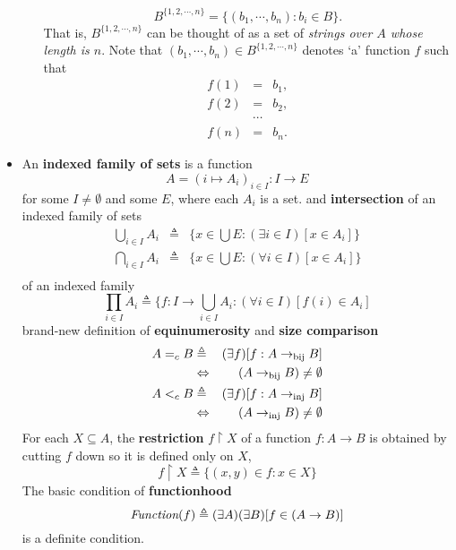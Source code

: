 \documentclass{myproc}
\begin{document}
\begin{itemize}
\begin{itemize}
	\[ B^{\{1, 2, \cdots, n\}} = \{(b_1, \cdots, b_n): b_i \in B\}.\]
	That is, $B^{\{1, 2, \cdots, n\}}$ can be thought of as a set of 
	{\em{}strings over $A$ whose length is $n$\/}.
	Note that $(b_1, \cdots, b_n) \in B^{\{1, 2, \cdots, n\}}$ denotes `a'
	function $f$ such that
	\begin{eqnarray*}
	f(1) & = & b_1,\\
	f(2) & = & b_2,\\
	& \cdots & \\
	f(n) & = & b_n.
	\end{eqnarray*}
		\end{itemize}
\item An {\bf{}indexed family of sets} is a function
	\[ A = (i \mapsto A_i)_{i\in I}: I \rightarrow E\]
	for some $I \ne \emptyset$ and some $E$, where each $A_i$ is a
	set.
	\bit
	 and {\bf{}intersection} of an indexed family of sets
		\begin{eqnarray*}
		\bigcup_{i \in I}A_i & \triangleq &
			\{x \in \bigcup E: (\exists{i \in I})[x \in A_i]\}\\
		\bigcap_{i \in I}A_i & \triangleq &
			\{x \in \bigcup E: (\forall{i \in I})[x \in A_i]\}\\
		\end{eqnarray*}
	 of an indexed family
		\[ \prod_{i \in I}A_i \triangleq
		\{f: I \rightarrow \bigcup_{i\in{I}}A_i: 
		(\forall{i \in I})[f(i) \in A_i] \]
	\w brand-new definition of {\bf{}equinumerosity} and 
		{\bf{}size comparison}
		\begin{eqnarray*}
		A =_c B & \triangleq & (\exists{f})[f: A 
			\rightarrow_{\mbox{\scriptsize{}bij}}
			B]\\
		&  \Leftrightarrow & (A 
			\rightarrow_{\mbox{\scriptsize{}bij}} B) \ne 
			\emptyset\\
		A <_c B & \triangleq & (\exists{f})[f: A 
			\rightarrow_{\mbox{\scriptsize{}inj}}
			B]\\
		& \Leftrightarrow & (A 
			\rightarrow_{\mbox{\scriptsize{}inj}} B) \ne \emptyset
		\end{eqnarray*}
	\eit
\w For each $X \subseteq A$, the {\bf{}restriction} $f \upharpoonright X$ of
	a  function $f: A \rightarrow B$ is
	obtained by cutting $f$ down so it is
		defined only on $X$,
		\[ f\upharpoonright X \triangleq \{(x, y) \in f: x \in X\} \]
\w The basic condition of {\bf{}functionhood}
	\[ \mbox{\em{}Function}(f) \triangleq (\exists{A})(\exists{B})[f \in (A
		\rightarrow B)] \]
	is a definite condition.
\end{itemize}
\end{document}
